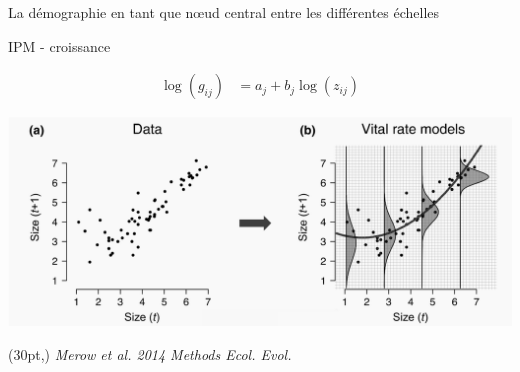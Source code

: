 \documentclass[11pt, compress, aspectratio=1610]{beamer}
\newcommand\smallcitation[1]{%
\begin{textblock*}{\textwidth}(30pt,\textheight)
	\raggedleft \footnotesize\textit{#1}
\end{textblock*}}
\newcommand{\stopcols}{\end{columns}}
\begin{document}
\begin{frame}{La démographie en tant que nœud central entre les
différentes échelles}

\begin{frame}{IPM - croissance}
\protect\hypertarget{ipm---croissance}{}

\vspace*{-13mm}
\begin{align*}
  \log(g_{ij}) &= a_{j} + b_{j}\log(z_{ij})
\end{align*}

\centering

\includegraphics[scale=0.46]{figures/Merow2014a.png}

\par

\smallcitation{Merow et al. 2014 Methods Ecol. Evol.}

\end{frame}


\end{frame}
\end{document}
